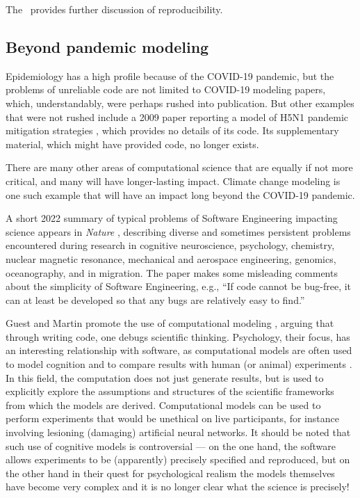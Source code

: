 \documentclass{comjnl}
\begin{document}
The \supplement\ provides further discussion of reproducibility.

\subsection{Beyond pandemic modeling}
\label{section-science-beyond-pandemic-modeling}

Epidemiology has a high profile because of the COVID-19 pandemic, but the problems of unreliable code are not limited to COVID-19 modeling papers, which, understandably, were perhaps rushed into publication. But other examples that were not rushed include a 2009 paper reporting a model of H5N1 pandemic mitigation strategies \cite{flu-model}, which provides no details of its code. Its supplementary material, which might have provided code, no longer exists.

There are many other areas of computational science that are equally if not more critical, and many will have longer-lasting impact. Climate change modeling is one such example that will have an impact long beyond the COVID-19 pandemic.

A short 2022 summary of typical problems of Software Engineering impacting science appears in \emph{Nature\/} \cite{nature-review}, describing diverse and sometimes persistent problems encountered during research in cognitive neuroscience, psychology, chemistry, nuclear magnetic resonance, mechanical and aerospace engineering, genomics, oceanography, and in migration. The paper \cite{nature-review}  makes some misleading comments about the simplicity of Software Engineering, e.g., ``If code cannot be bug-free, it can at least be developed so that any bugs are relatively easy to find.''

Guest and Martin promote the use of computational modeling \cite{psychological-modeling}, arguing that through writing code, one debugs scientific thinking. Psychology, their focus, has an interesting relationship with software, as computational models are often used to model cognition and to compare results with human (or animal) experiments \cite{psychological-modeling}. In this field, the computation does not just generate results, but is used to explicitly explore the assumptions and structures of the scientific frameworks from which the models are derived. Computational models can be used to perform experiments that would be unethical on live participants, for instance involving lesioning (damaging) artificial neural networks. It should be noted that such use of cognitive models is controversial --- on the one hand, the software allows experiments to be (apparently) precisely specified and reproduced, but on the other hand in their quest for psychological realism the models themselves have become very complex and it is no longer clear what the science is precisely!
\end{document}
